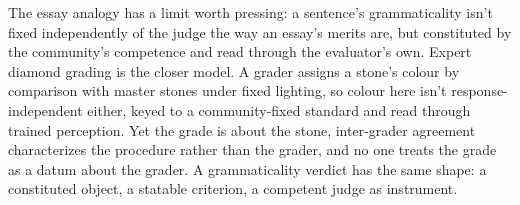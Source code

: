 The essay analogy has a limit worth pressing: a sentence's grammaticality isn't fixed independently of the judge the way an essay's merits are, but constituted by the community's competence and read through the evaluator's own. Expert diamond grading is the closer model. A grader assigns a stone's colour by comparison with master stones under fixed lighting, so colour here isn't response-independent either, keyed to a community-fixed standard and read through trained perception. Yet the grade is about the stone, inter-grader agreement characterizes the procedure rather than the grader, and no one treats the grade as a datum about the grader. A grammaticality verdict has the same shape: a constituted object, a statable criterion, a competent judge as instrument.
